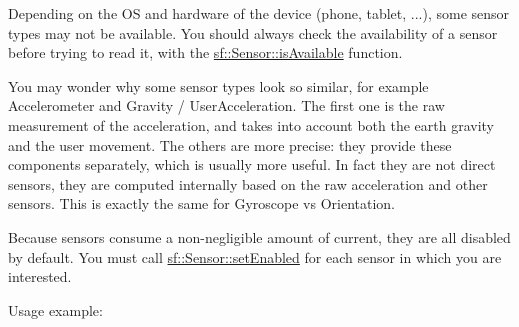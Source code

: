 Depending on the OS and hardware of the device (phone, tablet, ...), some sensor types may not be available. You should always check the availability of a sensor before trying to read it, with the \mbox{\hyperlink{classsf_1_1_sensor_a7b7a2570218221781233bd495323abf0}{sf\+::\+Sensor\+::is\+Available}} function.

You may wonder why some sensor types look so similar, for example Accelerometer and Gravity / User\+Acceleration. The first one is the raw measurement of the acceleration, and takes into account both the earth gravity and the user movement. The others are more precise\+: they provide these components separately, which is usually more useful. In fact they are not direct sensors, they are computed internally based on the raw acceleration and other sensors. This is exactly the same for Gyroscope vs Orientation.

Because sensors consume a non-\/negligible amount of current, they are all disabled by default. You must call \mbox{\hyperlink{classsf_1_1_sensor_afb31c5697d2e0a5fec70d702ec1d6cd9}{sf\+::\+Sensor\+::set\+Enabled}} for each sensor in which you are interested.

Usage example\+: 
\begin{DoxyCode}{0}
\DoxyCodeLine{\{}
\DoxyCodeLine{    \textcolor{comment}{// gravity sensor is available}}
\DoxyCodeLine{\}}
\DoxyCodeLine{}
\DoxyCodeLine{\textcolor{comment}{// enable the gravity sensor}}
\DoxyCodeLine{}
\DoxyCodeLine{\textcolor{comment}{// get the current value of gravity}}
\end{DoxyCode}
 \begin{DoxyVerb}\end{DoxyVerb}
 

